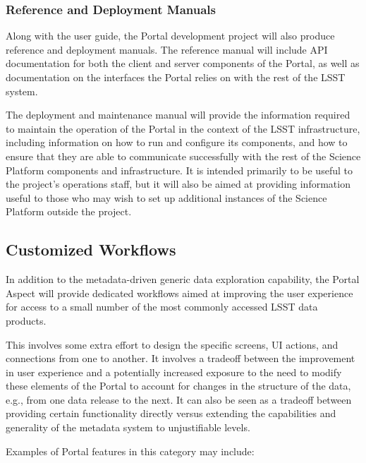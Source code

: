 \subsubsection{Reference and Deployment Manuals}

Along with the user guide, the Portal development project will also produce reference and deployment manuals.
The reference manual will include API documentation for both the client and server components of the Portal, as well as documentation on the interfaces the Portal relies on with the rest of the LSST system.

The deployment and maintenance manual will provide the information required to maintain the operation of the Portal in the context of the LSST infrastructure, including information on how to run and configure its components, and how to ensure that they are able to communicate successfully with the rest of the Science Platform components and infrastructure.
It is intended primarily to be useful to the project's operations staff, but it will also be aimed at providing information useful to those who may wish to set up additional instances of the Science Platform outside the project.

\subsection{Customized Workflows}\label{customized-workflows}

In addition to the metadata-driven generic data exploration capability, the Portal Aspect will provide dedicated workflows aimed at improving the user experience for access to a small number of the most commonly accessed LSST data products.

This involves some extra effort to design the specific screens, UI actions, and connections from one to another.
It involves a tradeoff between the improvement in user experience and a potentially increased exposure to the need to modify these elements of the Portal to account for changes in the structure of the data, e.g., from one data release to the next.
It can also be seen as a tradeoff between providing certain functionality directly versus extending the capabilities and generality of the metadata system to unjustifiable levels.

Examples of Portal features in this category may include:

